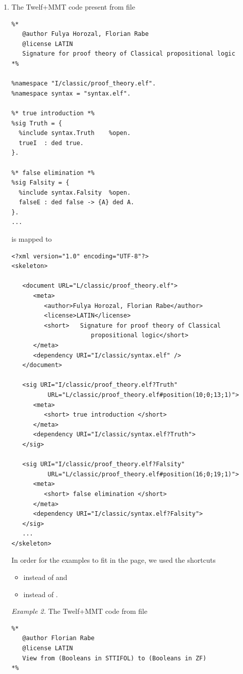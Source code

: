 \begin{enumerate}
\item The Twelf+MMT code present from file 
\begin{verbatim}
%*
   @author Fulya Horozal, Florian Rabe
   @license LATIN
   Signature for proof theory of Classical propositional logic
*%

%namespace "I/classic/proof_theory.elf".
%namespace syntax = "syntax.elf".

%* true introduction *%
%sig Truth = {
  %include syntax.Truth    %open.
  trueI  : ded true.
}.

%* false elimination *%
%sig Falsity = {
  %include syntax.Falsity  %open.
  falseE : ded false -> {A} ded A.
}.
...
\end{verbatim}
is mapped to
\begin{verbatim}
<?xml version="1.0" encoding="UTF-8"?>
<skeleton>

   <document URL="L/classic/proof_theory.elf">
      <meta>
         <author>Fulya Horozal, Florian Rabe</author>
         <license>LATIN</license>
         <short>   Signature for proof theory of Classical 
                      propositional logic</short>
      </meta>
      <dependency URI="I/classic/syntax.elf" />
   </document>

   <sig URI="I/classic/proof_theory.elf?Truth" 
          URL="L/classic/proof_theory.elf#position(10;0;13;1)">
      <meta>
         <short> true introduction </short>
      </meta>
      <dependency URI="I/classic/syntax.elf?Truth">
   </sig>

   <sig URI="I/classic/proof_theory.elf?Falsity"  
          URL="L/classic/proof_theory.elf#position(16;0;19;1)">
      <meta>
         <short> false elimination </short>
      </meta>
      <dependency URI="I/classic/syntax.elf?Falsity">
   </sig>
   ...
</skeleton>
\end{verbatim}
In order for the examples to fit in the page, we used the shortcuts 
\begin{itemize} 
\item {}  instead of   and
\item {} instead of .
\end{itemize}


\item[\textit{Example 2.}]  The Twelf+MMT code from file 
\begin{verbatim}
%*
   @author Florian Rabe
   @license LATIN
   View from (Booleans in STTIFOL) to (Booleans in ZF)
*%


\end{verbatim}
\end{enumerate}

